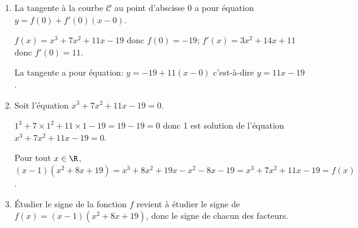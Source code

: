 \begin{enumerate}
\begin{center}
{\renewcommand{\arraystretch}{1.3}
\def\esp{\hspace*{1.5cm}}
\def\hauteur{20pt}
$\begin{array}{|c| *6{c} c|}
\hline
 x & -\infty & \esp & -\frac{11}{3} & \esp & -1 & \esp & +\infty \\
 \hline
f'(x) &  &  \pmb{+} & \vline\hspace{-2.7pt}0 & \pmb{-} & \vline\hspace{-2.7pt}0 & \pmb{+} & \\  
\hline
  &  &  & \Rnode{max1}{\approx -14,52} & & & &  \Rnode{max2}{~} \\
f (x) & &  & & & & & \rule{0pt}{\hauteur}\\
 & \Rnode{min1}{~} & & & & \Rnode{min2}{-24} & & \rule{0pt}{\hauteur} 
\ncline{->}{min1}{max1} 
\ncline{->}{max1}{min2}
\ncline{->}{min2}{max2} \\
\hline
\end{array}$
}
\end{center}


\item La tangente à la courbe $\mathcal{C}$ au point d'abscisse $0$ a pour équation
$y=f(0) + f'(0)\left (x-0\right )$.

$f(x)=x^3 + 7x^2 +11x - 19 $ donc $f(0)=-19$; $f'(x)=3x^2+14x+11$ donc $f'(0)=11$.

La tangente a pour équation: $y = -19 + 11\left (x-0\right )$ c'est-à-dire $y = 11x-19$.

\item Soit l'équation $x^3 + 7x^2 +11x - 19 = 0$.

$1^3 +7\times 1^2 +11\times 1 - 19 = 19-19=0$ donc 1 est solution de l'équation $x^3 + 7x^2 +11x - 19 = 0$.

\smallskip

Pour tout $x\in\R$, $(x-1)(x^2+8x+19) = x^3+8x^2+19x -x^2 -8x-19=x^3 +7x^2 +11x-19 = f(x)$.



\item Étudier le signe de la fonction $f$ revient à étudier le signe de $f(x)=(x-1)(x^2+8x+19)$, donc le signe de chacun des facteurs.

\end{enumerate}
